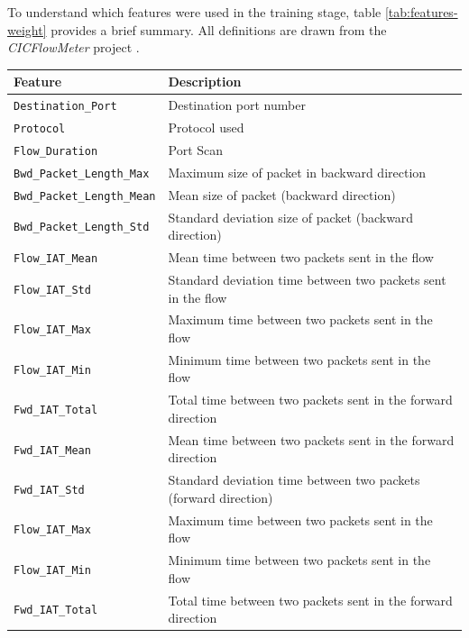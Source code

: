 \noindent To understand which features were used in the training stage, table \ref{tab:features-weight} provides a brief summary. All definitions are drawn from the \textit{CICFlowMeter} project \cite{icissp17}. \\

\begin{table}[h!]
    \centering
    \begin{tabular}{l|l}
        \toprule 
        Feature & Description \\
        \midrule
        \rowcolor{black!10} \texttt{Destination\_Port} & Destination port number  \\
        \texttt{Protocol} & Protocol used \\
        \rowcolor{black!10} \texttt{Flow\_Duration} & Port Scan \\
        \texttt{Bwd\_Packet\_Length\_Max} & Maximum size of packet in backward direction \\
        \rowcolor{black!10} \texttt{Bwd\_Packet\_Length\_Mean} & Mean size of packet (backward direction) \\
        \texttt{Bwd\_Packet\_Length\_Std} & Standard deviation size of packet (backward direction) \\
        \rowcolor{black!10} \texttt{Flow\_IAT\_Mean} & Mean time between two packets sent in the flow \\
        \texttt{Flow\_IAT\_Std} & Standard deviation time between two packets sent in the flow \\
        \rowcolor{black!10} \texttt{Flow\_IAT\_Max} & Maximum time between two packets sent in the flow \\
        \texttt{Flow\_IAT\_Min} & Minimum time between two packets sent in the flow \\
        \rowcolor{black!10} \texttt{Fwd\_IAT\_Total} & Total time between two packets sent in the forward direction \\
        \texttt{Fwd\_IAT\_Mean} & Mean time between two packets sent in the forward direction \\
        \rowcolor{black!10} \texttt{Fwd\_IAT\_Std} & Standard deviation time between two packets (forward direction) \\
        \texttt{Flow\_IAT\_Max} & Maximum time between two packets sent in the flow \\
        \rowcolor{black!10} \texttt{Flow\_IAT\_Min} & Minimum time between two packets sent in the flow \\
        \texttt{Fwd\_IAT\_Total} & Total time between two packets sent in the forward direction \\

\end{tabular}
\end{table}
